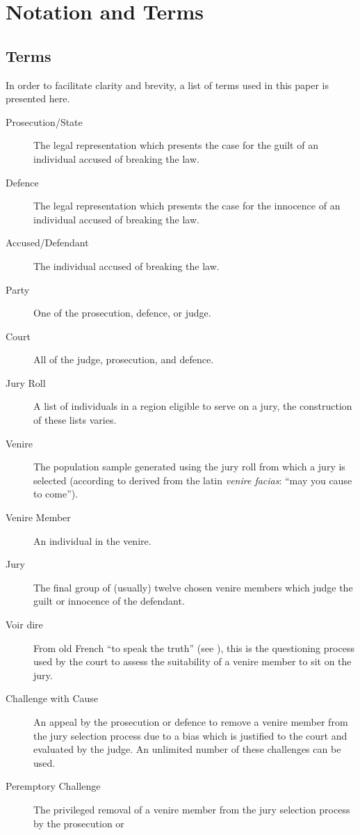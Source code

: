 \chapter*{Notation and Terms}
\label{c:Notation}

\section*{Terms}

In order to facilitate clarity and brevity, a list of terms used in this paper is presented here.

\begin{description}
\item[Prosecution/State] The legal representation which presents the case for the guilt of an individual accused of breaking the law.
\item[Defence] The legal representation which presents the case for the innocence of an individual accused of breaking the law.
\item[Accused/Defendant] The individual accused of breaking the law.
\item[Party] One of the prosecution, defence, or judge.
\item[Court] All of the judge, prosecution, and defence.
\item[Jury Roll] A list of individuals in a region eligible to serve on a jury, the construction of these lists varies.
\item[Venire] The population sample generated using the jury roll from which a jury is selected (according to \cite{venireety}
  derived from the latin \textit{venire facias}: ``may you cause to come'').
\item[Venire Member] An individual in the venire.
\item[Jury] The final group of (usually) twelve chosen venire members which judge the guilt or innocence of the
    defendant.
\item[Voir dire] From old French ``to speak the truth'' (see \cite{voirety}), this is the questioning process used by the court to
  assess the suitability of a venire member to sit on the jury.
\item[Challenge with Cause] An appeal by the prosecution or defence to remove a venire member from the jury selection process due
  to a bias which is justified to the court and evaluated by the
  judge. An unlimited number of these challenges can be used.
\item[Peremptory Challenge] The privileged removal of a venire member from the jury selection process by the prosecution or

\end{description}
